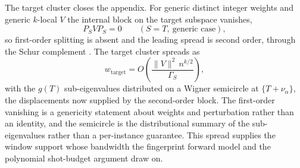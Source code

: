 The target cluster closes the appendix. For generic distinct integer weights and generic $k$-local $V$ the internal block on the target subspace vanishes,
\begin{equation*}
P_S V P_S = 0 \qquad (S = T ,\ \text{generic case}) ,
\end{equation*}
so first-order splitting is absent and the leading spread is second order, through the Schur complement \cite{horn2013matrix, bhatia1997matrix}. The target cluster spreads as
\begin{equation}\label{irf:target-cluster-second-order-spread}
w_{\mathrm{target}} = O\!\left( \frac{\|V\|^2 \, n^{k/2}}{\Gamma_S} \right) ,
\end{equation}
with the $g(T)$ sub-eigenvalues distributed on a Wigner semicircle at $\{ T + \nu_\alpha \}$, the displacements now supplied by the second-order block. The first-order vanishing is a genericity statement about weights and perturbation rather than an identity, and the semicircle is the distributional summary of the sub-eigenvalues rather than a per-instance guarantee. This spread supplies the window support whose bandwidth the fingerprint forward model and the polynomial shot-budget argument draw on.
